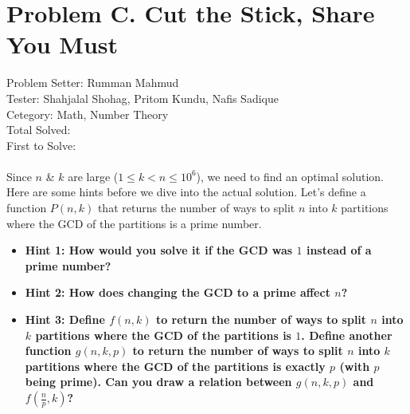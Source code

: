 \section*{Problem C. Cut the Stick, Share You Must}
Problem Setter: Rumman Mahmud \\
Tester: Shahjalal Shohag, Pritom Kundu, Nafis Sadique \\
Cetegory: Math, Number Theory \\
Total Solved:  \\
First to Solve: \\
\\
Since $n$ \& $k$ are large ($1 \le k < n \le 10^6$), we need to find an optimal solution.
Here are some hints before we dive into the actual solution.
Let’s define a function $P(n,k)$ that returns the number of ways to split $n$ into $k$ partitions 
where the GCD of the partitions is a prime number.
\begin{itemize}
  \item \bf{Hint 1:} How would you solve it if the GCD was $1$ instead of a prime number?
  \item \bf{Hint 2:} How does changing the GCD to a prime affect $n$?
  \item \bf{Hint 3:} Define $f(n,k)$ to return the number of ways to split $n$ into $k$
    partitions where the GCD of the partitions is $1$. Define another function $g(n,k,p)$ to
    return the number of ways to split $n$ into $k$ partitions where the GCD of the partitions
    is exactly $p$ (with $p$ being prime). Can you draw a relation between $g(n,k,p)$ and $f(\frac{n}{p},k)$?
\end{itemize}

